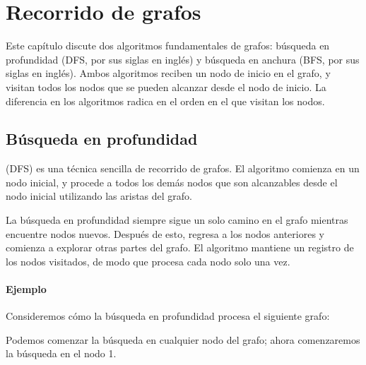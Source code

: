 \chapter{Recorrido de grafos}

Este capítulo discute dos algoritmos fundamentales
de grafos:
búsqueda en profundidad (DFS, por sus siglas en inglés) y búsqueda en anchura (BFS, por sus siglas en inglés).
Ambos algoritmos reciben un nodo de inicio
en el grafo,
y visitan todos los nodos que se pueden alcanzar
desde el nodo de inicio.
La diferencia en los algoritmos radica en el orden
en el que visitan los nodos.

\section{Búsqueda en profundidad}


 (DFS)
es una técnica sencilla de recorrido de grafos.
El algoritmo comienza en un nodo inicial,
y procede a todos los demás nodos que son
alcanzables desde el nodo inicial utilizando
las aristas del grafo.

La búsqueda en profundidad siempre sigue un solo
camino en el grafo mientras encuentre
nodos nuevos.
Después de esto, regresa a los nodos anteriores
y comienza a explorar otras partes del grafo.
El algoritmo mantiene un registro de los nodos visitados,
de modo que procesa cada nodo solo una vez.

\subsubsection*{Ejemplo}

Consideremos cómo la búsqueda en profundidad procesa
el siguiente grafo:
\begin{center}
\end{center}
Podemos comenzar la búsqueda en cualquier nodo del grafo;
ahora comenzaremos la búsqueda en el nodo 1.

